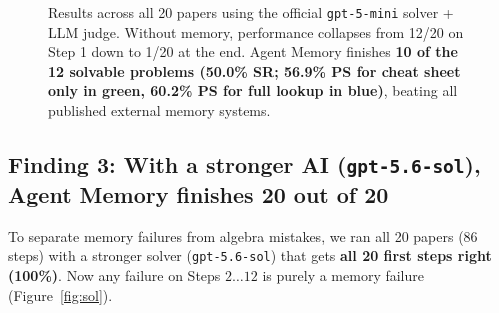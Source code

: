 \documentclass[11pt,a4paper]{article}
\begin{document}
\begin{figure}[H]
\caption{Results across all 20 papers using the official \texttt{gpt-5-mini} solver + LLM judge. Without memory, performance collapses from 12/20 on Step 1 down to 1/20 at the end. Agent Memory finishes \textbf{10 of the 12 solvable problems (50.0\% SR; 56.9\% PS for cheat sheet only in green, 60.2\% PS for full lookup in blue)}, beating all published external memory systems.}
\label{fig:mini}
\end{figure}

\subsection*{Finding 3: With a stronger AI (\texttt{gpt-5.6-sol}), Agent Memory finishes 20 out of 20}

To separate memory failures from algebra mistakes, we ran all 20 papers (86 steps) with a stronger solver (\texttt{gpt-5.6-sol}) that gets \textbf{all 20 first steps right (100\%)}. Now any failure on Steps $2\dots 12$ is purely a memory failure (Figure~\ref{fig:sol}).
\end{document}
